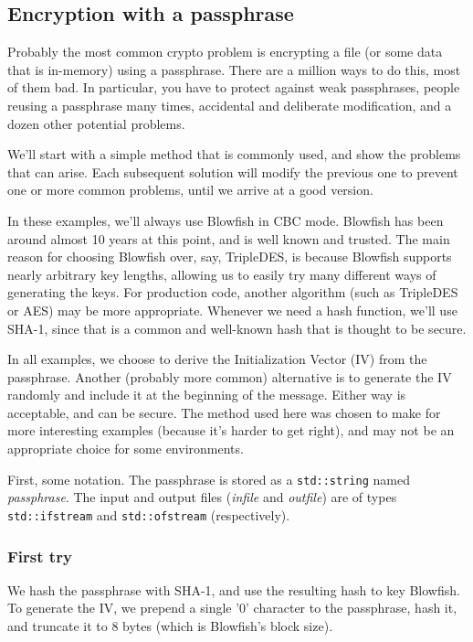 \documentclass{article}
\newcommand{\type}[1]{\texttt{#1}}
\newcommand{\variable}[1]{\textsl{#1}}
\begin{document}
\subsection{Encryption with a passphrase}

Probably the most common crypto problem is encrypting a file (or some data that
is in-memory) using a passphrase. There are a million ways to do this, most of
them bad. In particular, you have to protect against weak passphrases,
people reusing a passphrase many times, accidental and deliberate modification,
and a dozen other potential problems.

We'll start with a simple method that is commonly used, and show the problems
that can arise. Each subsequent solution will modify the previous one to
prevent one or more common problems, until we arrive at a good version.

In these examples, we'll always use Blowfish in CBC mode. Blowfish has been
around almost 10 years at this point, and is well known and trusted. The main
reason for choosing Blowfish over, say, TripleDES, is because Blowfish supports
nearly arbitrary key lengths, allowing us to easily try many different ways of
generating the keys. For production code, another algorithm (such as TripleDES
or AES) may be more appropriate. Whenever we need a hash function, we'll use
SHA-1, since that is a common and well-known hash that is thought to be secure.

In all examples, we choose to derive the Initialization Vector (IV) from the
passphrase. Another (probably more common) alternative is to generate the IV
randomly and include it at the beginning of the message. Either way is
acceptable, and can be secure. The method used here was chosen to make for more
interesting examples (because it's harder to get right), and may not be an
appropriate choice for some environments.

First, some notation. The passphrase is stored as a \type{std::string} named
\variable{passphrase}. The input and output files (\variable{infile} and
\variable{outfile}) are of types \type{std::ifstream} and \type{std::ofstream}
(respectively).

\subsubsection{First try}

We hash the passphrase with SHA-1, and use the resulting hash to key Blowfish.
To generate the IV, we prepend a single '0' character to the passphrase, hash
it, and truncate it to 8 bytes (which is Blowfish's block size).
\end{document}
